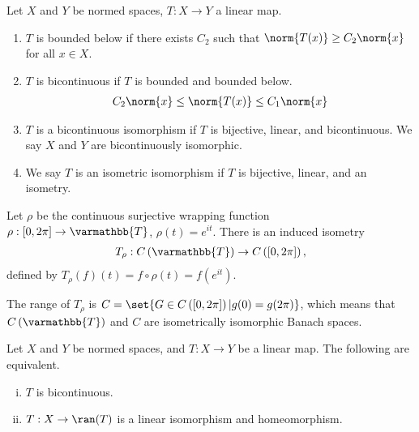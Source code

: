 \documentclass[10pt]{mypackage}
\renewcommand*{\mathbb}[1]{\varmathbb{#1}}
\begin{document}
\begin{definition}
  Let $X$ and $Y$ be normed spaces, $T: X\rightarrow Y$ a linear map.
  \begin{enumerate}[(1)]
    \item $T$ is bounded below if there exists $C_2$ such that $\norm{T(x)}\geq C_2\norm{x}$ for all $x\in X$.
    \item $T$ is bicontinuous if $T$ is bounded and bounded below.
      \begin{align*}
        C_2\norm{x} \leq \norm{T(x)}\leq C_1\norm{x}
      \end{align*}
    \item $T$ is a bicontinuous isomorphism if $T$ is bijective, linear, and bicontinuous. We say $X$ and $Y$ are bicontinuously isomorphic.
    \item We say $T$ is an isometric isomorphism if $T$ is bijective, linear, and an isometry.
  \end{enumerate}
\end{definition}
\begin{example}
  Let $\rho$ be the continuous surjective wrapping function $\rho: [0,2\pi]\rightarrow \mathbb{T}$, $\rho(t) = e^{it}$. There is an induced isometry
  \begin{align*}
    T_{\rho}: C\left(\mathbb{T}\right) \rightarrow C\left([0,2\pi]\right),
  \end{align*}
  defined by $T_{\rho}\left(f\right)(t) = f\circ \rho\left(t\right) = f\left(e^{it}\right)$.\newline

  The range of $T_{\rho}$ is $C= \set{G\in C\left([0,2\pi]\right)| g(0) = g(2\pi)}$, which means that $C\left(\mathbb{T}\right) $ and $ C$ are isometrically isomorphic Banach spaces.
\end{example}
\begin{proposition}
  Let $X$ and $Y$ be normed spaces, and $T:X\rightarrow Y$ be a linear map. The following are equivalent.
  \begin{enumerate}[(i)]
    \item $T$ is bicontinuous.
    \item $T: X\rightarrow \ran(T)$ is a linear isomorphism and homeomorphism.
  \end{enumerate}
\end{proposition}
\end{document}
